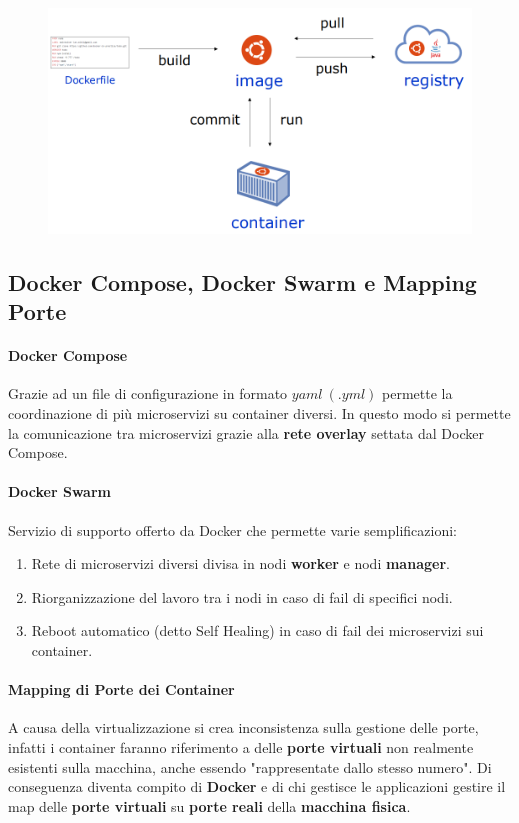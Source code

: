 \documentclass{article}
\begin{document}
\begin{figure}[htbp]
    \center
    \includegraphics[scale=0.35]{img/howWorksDocker.png}
\end{figure}

\subsection{Docker Compose, Docker Swarm e Mapping Porte}

\vspace*{10px}

\paragraph{Docker Compose} Grazie ad un file di configurazione in formato $yaml \:(.yml)$ permette la coordinazione di più microservizi su container diversi. In questo modo si permette la comunicazione tra microservizi grazie alla \textbf{rete overlay} settata dal Docker Compose.

\paragraph{Docker Swarm} Servizio di supporto offerto da Docker che permette varie semplificazioni:

\begin{enumerate}
    \item Rete di microservizi diversi divisa in nodi \textbf{worker} e nodi \textbf{manager}.
    \item Riorganizzazione del lavoro tra i nodi in caso di fail di specifici nodi.
    \item Reboot automatico (detto Self Healing) in caso di fail dei microservizi sui container.
\end{enumerate}

\paragraph{Mapping di Porte dei Container} A causa della virtualizzazione si crea inconsistenza sulla gestione delle porte, infatti i container faranno riferimento a delle \textbf{porte virtuali} non realmente esistenti sulla macchina, anche essendo "rappresentate dallo stesso numero". Di conseguenza diventa compito di \textbf{Docker} e di chi gestisce le applicazioni gestire il map delle \textbf{porte virtuali} su \textbf{porte reali} della \textbf{macchina fisica}.
\end{document}
